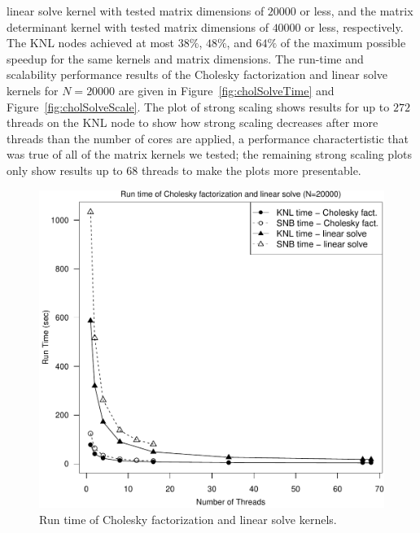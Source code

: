   linear solve kernel with tested matrix dimensions of $20000$ or less,
  and the matrix determinant kernel with tested matrix dimensions of $40000$ or
  less, respectively.
The KNL nodes achieved at most $38\%$, $48\%$, and $64\%$ of the
  maximum possible speedup for the same kernels and matrix dimensions.
The run-time and scalability performance results of the Cholesky factorization
  and linear solve kernels for $N=20000$ are given in Figure~\ref{fig:cholSolveTime}
  and Figure~\ref{fig:cholSolveScale}.
The plot of strong scaling shows results for up to $272$ threads on the KNL
  node to show how strong scaling decreases after more threads than the number of cores
  are applied, a performance charactertistic that was true of all of the matrix
  kernels we tested; the remaining strong scaling plots only show results up to
  $68$ threads to make the plots more presentable.
\begin{figure}
\includegraphics[height=\columnwidth, width=\columnwidth]{chol_solve_20000_68-rt.pdf}
\caption{Run time of Cholesky factorization and linear solve kernels.}
\end{figure}
